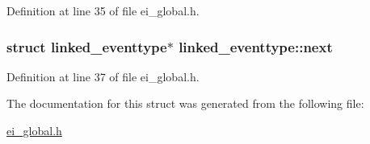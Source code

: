 Definition at line 35 of file ei\_\-global.h.\hypertarget{structlinked__eventtype_aaefe49bb1a4cbb8f706e94f565b6d411}{
\subsubsection[{next}]{\setlength{\rightskip}{0pt plus 5cm}struct {\bf linked\_\-eventtype}$\ast$ {\bf linked\_\-eventtype::next}}}
\label{structlinked__eventtype_aaefe49bb1a4cbb8f706e94f565b6d411}


Definition at line 37 of file ei\_\-global.h.

The documentation for this struct was generated from the following file:\begin{DoxyCompactItemize}
\item 
\hyperlink{ei__global_8h}{ei\_\-global.h}\end{DoxyCompactItemize}
